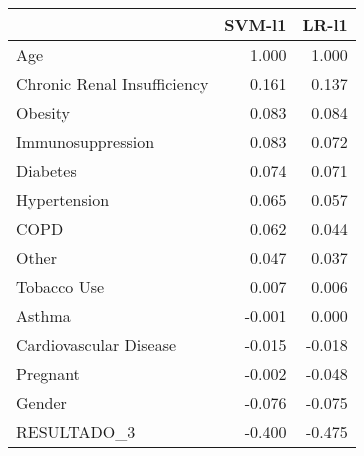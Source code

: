\begin{tabular}{lrr}
\toprule
{} &  SVM-l1 &  LR-l1 \\
\midrule
Age                         &   1.000 &  1.000 \\
Chronic Renal Insufficiency &   0.161 &  0.137 \\
Obesity                     &   0.083 &  0.084 \\
Immunosuppression           &   0.083 &  0.072 \\
Diabetes                    &   0.074 &  0.071 \\
Hypertension                &   0.065 &  0.057 \\
COPD                        &   0.062 &  0.044 \\
Other                       &   0.047 &  0.037 \\
Tobacco Use                 &   0.007 &  0.006 \\
Asthma                      &  -0.001 &  0.000 \\
Cardiovascular Disease      &  -0.015 & -0.018 \\
Pregnant                    &  -0.002 & -0.048 \\
Gender                      &  -0.076 & -0.075 \\
RESULTADO\_3                 &  -0.400 & -0.475 \\
\bottomrule
\end{tabular}
